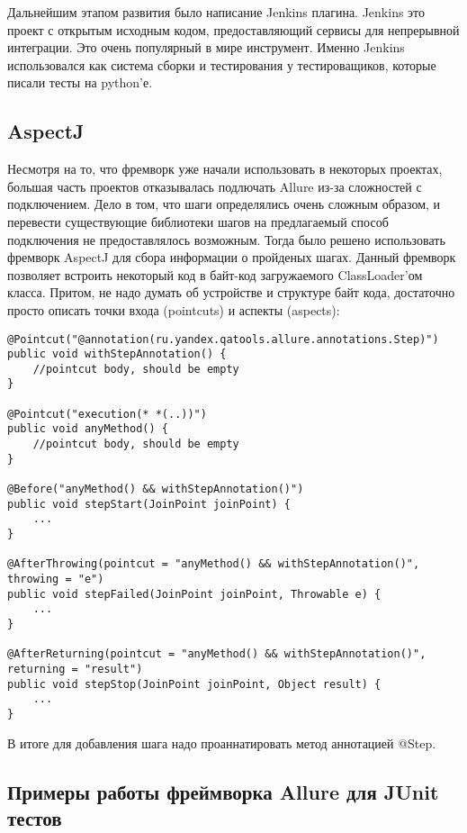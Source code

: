 Дальнейшим этапом развития было написание Jenkins плагина. Jenkins это проект с открытым исходным кодом, предоставляющий сервисы для непрерывной интеграции. Это очень популярный в мире инструмент. Именно Jenkins использовался как система сборки и тестирования у тестироващиков, которые писали тесты на python'е.  

\subsection{AspectJ}

Несмотря на то, что фремворк уже начали использовать в некоторых проектах, большая часть проектов отказывалась подлючать Allure из-за сложностей с подключением. Дело в том, что шаги определялись очень сложным образом, и перевести существующие библиотеки шагов на предлагаемый способ подключения не предоставлялось возможным. Тогда было решено использовать фремворк AspectJ для сбора информации о пройденых шагах. Данный фремворк позволяет встроить некоторый код в байт-код загружаемого ClassLoader'ом класса. Притом, не надо думать об устройстве и структуре байт кода, достаточно просто описать  точки входа (pointcuts) и аспекты (aspects): 

\newpage
\begin{lstlisting}[caption=Пример описание точек входа и аспектов.]
@Pointcut("@annotation(ru.yandex.qatools.allure.annotations.Step)")
public void withStepAnnotation() {
    //pointcut body, should be empty
}

@Pointcut("execution(* *(..))")
public void anyMethod() {
    //pointcut body, should be empty
}

@Before("anyMethod() && withStepAnnotation()")
public void stepStart(JoinPoint joinPoint) {
    ...
}

@AfterThrowing(pointcut = "anyMethod() && withStepAnnotation()", throwing = "e")
public void stepFailed(JoinPoint joinPoint, Throwable e) {
    ...
}

@AfterReturning(pointcut = "anyMethod() && withStepAnnotation()", returning = "result")
public void stepStop(JoinPoint joinPoint, Object result) {
    ...
}
\end{lstlisting}


В итоге для добавления шага надо проаннатировать метод аннотацией @Step. 

\newpage
\subsection{Примеры работы фреймворка Allure для JUnit тестов}

